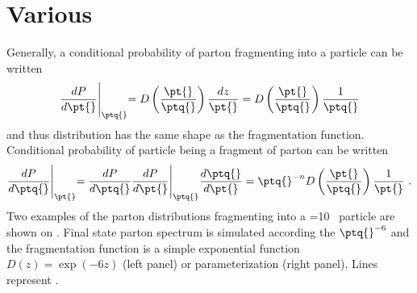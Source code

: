 \clearpage
\section{Various}

Generally, a conditional probability of parton \ptq{} fragmenting into a particle \pt{} can be written
\begin{equation}\label{eq:child}
\frac{dP}{d\pt{}}\Biggl\vert_{\ptq{}} = D\left(\frac{\pt{}}{\ptq{}}\right)\frac{dz}{\pt{}} = D\left(\frac{\pt{}}{\ptq{}}\right)\frac{1}{\ptq{}}
\end{equation}
and thus \pt{} distribution has the same shape as the fragmentation function. 
Conditional probability of particle \pt{} being a fragment of parton \ptq{} can be written
\begin{equation}\label{eq:parent}
\frac{dP}{d\ptq{}}\Biggl\vert_{\pt{}} = 
       \frac{dP}{d\ptq{}} \frac{dP}{d\pt{}}\Biggl\vert_{\ptq{}} \frac{d\ptq{}}{d\pt{}}= 
       \ptq{}^{-n} D\left(\frac{\pt{}}{\ptq{}}\right)\frac{1}{\pt{}}\ .
\end{equation}
Two examples of the parton distributions fragmenting into a \pt{}=10 \gevc\ particle are shown on . Final state parton spectrum is simulated according the $\ptq{}^{-6}$ and the fragmentation function is a simple exponential function $D(z)=\exp(-6z)$ (left panel) or parameterization  (right panel). Lines represent .
